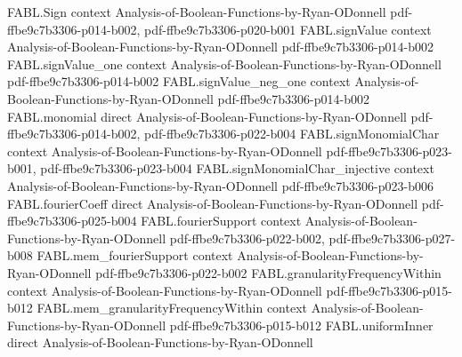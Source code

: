 \begin{theorem}
\label{FABL.biasedFourierCoeff_dictator}
\leanok
{}
\proofstep
  {FABL.Sign}
  {context}
  {Analysis-of-Boolean-Functions-by-Ryan-ODonnell}
  {pdf-ffbe9c7b3306-p014-b002,
    pdf-ffbe9c7b3306-p020-b001}
\proofstep
  {FABL.signValue}
  {context}
  {Analysis-of-Boolean-Functions-by-Ryan-ODonnell}
  {pdf-ffbe9c7b3306-p014-b002}
\proofstep
  {FABL.signValue_one}
  {context}
  {Analysis-of-Boolean-Functions-by-Ryan-ODonnell}
  {pdf-ffbe9c7b3306-p014-b002}
\proofstep
  {FABL.signValue_neg_one}
  {context}
  {Analysis-of-Boolean-Functions-by-Ryan-ODonnell}
  {pdf-ffbe9c7b3306-p014-b002}
\proofstep
  {FABL.monomial}
  {direct}
  {Analysis-of-Boolean-Functions-by-Ryan-ODonnell}
  {pdf-ffbe9c7b3306-p014-b002,
    pdf-ffbe9c7b3306-p022-b004}
\proofstep
  {FABL.signMonomialChar}
  {context}
  {Analysis-of-Boolean-Functions-by-Ryan-ODonnell}
  {pdf-ffbe9c7b3306-p023-b001,
    pdf-ffbe9c7b3306-p023-b004}
\proofstep
  {FABL.signMonomialChar_injective}
  {context}
  {Analysis-of-Boolean-Functions-by-Ryan-ODonnell}
  {pdf-ffbe9c7b3306-p023-b006}
\proofstep
  {FABL.fourierCoeff}
  {direct}
  {Analysis-of-Boolean-Functions-by-Ryan-ODonnell}
  {pdf-ffbe9c7b3306-p025-b004}
\proofstep
  {FABL.fourierSupport}
  {context}
  {Analysis-of-Boolean-Functions-by-Ryan-ODonnell}
  {pdf-ffbe9c7b3306-p022-b002,
    pdf-ffbe9c7b3306-p027-b008}
\proofstep
  {FABL.mem_fourierSupport}
  {context}
  {Analysis-of-Boolean-Functions-by-Ryan-ODonnell}
  {pdf-ffbe9c7b3306-p022-b002}
\proofstep
  {FABL.granularityFrequencyWithin}
  {context}
  {Analysis-of-Boolean-Functions-by-Ryan-ODonnell}
  {pdf-ffbe9c7b3306-p015-b012}
\proofstep
  {FABL.mem_granularityFrequencyWithin}
  {context}
  {Analysis-of-Boolean-Functions-by-Ryan-ODonnell}
  {pdf-ffbe9c7b3306-p015-b012}
\proofstep
  {FABL.uniformInner}
  {direct}
  {Analysis-of-Boolean-Functions-by-Ryan-ODonnell}

\end{theorem}
